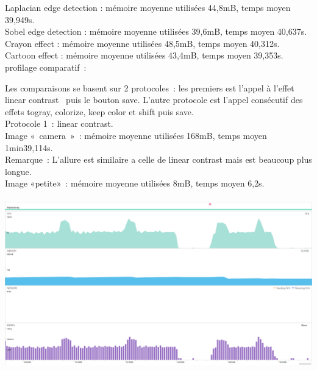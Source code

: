 \documentclass[12pt]{article}
\begin{document}
    Laplacian edge detection : mémoire moyenne utilisées 44,8mB, temps moyen 39,949s.\\


    Sobel edge detection : mémoire moyenne utilisées 39,6mB, temps moyen 40,637s.\\


    Crayon effect : mémoire moyenne utilisées 48,5mB, temps moyen 40,312s.\\


    Cartoon effect : mémoire moyenne utilisées 43,4mB, temps moyen 39,353s.\\



    profilage comparatif :

    Les comparaisons se basent sur 2 protocoles : les premiers est l’appel à l’effet linear contrast  puis le bouton save. L’autre protocole est l’appel consécutif des effets togray, colorize, keep color et shift puis save. \\


    Protocole 1 : linear contrast.\\

    Image « camera » : mémoire moyenne utilisées 168mB, temps moyen 1min39,114s.\\

    Remarque :
    L’allure est similaire a celle de linear contrast mais est beaucoup plus longue. \\


    Image «petite» : mémoire moyenne utilisées 8mB, temps moyen 6,2s.\\



\\
    \includegraphics{petite-linear}


\\
\\
\end{document}
